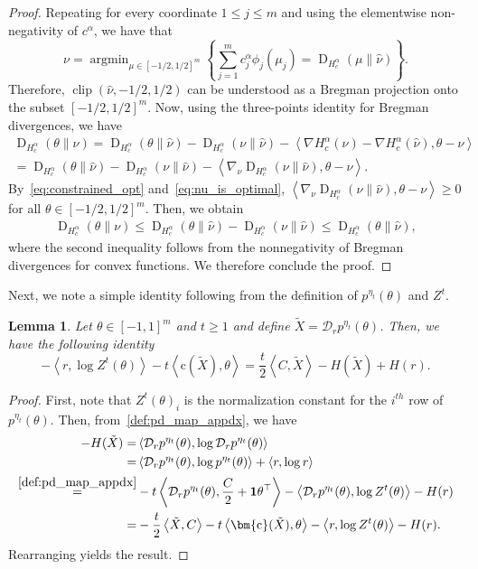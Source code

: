 \documentclass[10pt]{article}
\newcommand{\DHa}{\D_{H_c^\alpha}}
\DeclareMathOperator*{\argmin}{argmin}
\newcommand{\inner}[2]{\left\langle #1,#2\right\rangle}
\newcommand{\D}{\operatorname{D}}
\newcommand{\diag}[1]{\mathcal{D}_{#1}}
\theoremstyle{plain}
\newtheorem{lemma}[theorem]{Lemma}
\theoremstyle{definition}
\theoremstyle{remark}
\newcommand{\one}{\mathbf{1}}
\newcommand{\col}{\bm{\mathrm{c}}}
\begin{document}
\begin{proof}
    Repeating for every coordinate $1\leq j\leq m$ and using the elementwise non-negativity of $c^\alpha$, we have that
    \begin{equation}\label{eq:nu_is_optimal}
        \nu=\argmin_{\mu\in[-1/2,1/2]^m}\left\{\sum_{j=1}^mc^\alpha_j\phi_j(\mu_j)=\DHa(\mu\|\hat\nu)\right\}.
    \end{equation}
    Therefore, $\operatorname{clip}(\hat\nu, -1/2, 1/2)$ can be understood as a Bregman projection onto the subset $[-1/2, 1/2]^m$. Now, using the three-points identity for Bregman divergences, we have
    \begin{align*}
        \DHa(\theta\|\nu)=\DHa(\theta\|\hat\nu)-\DHa(\nu\|\hat\nu) -\inner{\nabla H_c^\alpha(\nu)-\nabla H_c^\alpha(\hat\nu)}{\theta-\nu}\\
        =\DHa(\theta\|\hat\nu)-\DHa(\nu\|\hat\nu) -\inner{\nabla_\nu \DHa(\nu\|\hat\nu)}{\theta-\nu}.
    \end{align*}
    By~\eqref{eq:constrained_opt} and~\eqref{eq:nu_is_optimal},  $\inner{\nabla_\nu \DHa(\nu\|\hat\nu)}{\theta-\nu}\geq 0$ for all $\theta\in[-1/2, 1/2]^m$. Then, we obtain
    \begin{align*}
        \DHa(\theta\|\nu)\leq\DHa(\theta\|\hat\nu)-\DHa(\nu\|\hat\nu)
        \leq \DHa(\theta\|\hat\nu),
    \end{align*}
    where the second inequality follows from the nonnegativity of Bregman divergences for convex functions. We therefore conclude the proof.
\end{proof}

Next, we note a simple identity following from the definition of $p^{\eta_t}(\theta)$ and $Z^t$.
\begin{lemma}\label{lem:pd_obj_relation}
    Let $\theta\in [-1,1]^m$ and $t\geq 1$ and define $\tilde X=\diag{r}p^{\eta_t}(\theta)$. Then, we have the following identity
    \begin{equation}\label{eq:pd_obj_relation}
        -\inner{r}{\log Z^t(\theta)}-t\inner{\col(\tilde X)}{\theta}=\frac{t}{2}\inner{C}{\tilde X}-H(\tilde X)+H(r).
    \end{equation}
\end{lemma}
\begin{proof}
    First, note that $Z^t(\theta)_i$ is the normalization constant for the $i^{th}$ row of $p^{\eta_t}(\theta)$. Then, from~\eqref{def:pd_map_appdx}, we have
    \begin{align*}
       -H(\tilde X)=&\inner{\diag{r}p^{\eta_t}(\theta)}{\log \diag{r} p^{\eta_t}(\theta)}\\
       =&\inner{\diag{r}p^{\eta_t}(\theta)}{\log p^{\eta_t}(\theta)}+\inner{r}{\log r}\\
       \stackrel{\eqref{def:pd_map_appdx}}=&-t\inner{\diag{r}p^{\eta_t}(\theta)}{\frac{C}{2}+ \one\theta^\top}-\inner{\diag{r}p^{\eta_t}(\theta)}{\log Z^t(\theta)}-H(r)\\
       =&-\frac{t}{2}\inner{\tilde X}{C}-t\inner{\col(\tilde X)}{\theta}-\inner{r}{\log Z^t(\theta)}-H(r).
    \end{align*}
    Rearranging yields the result.
\end{proof}
\end{document}
